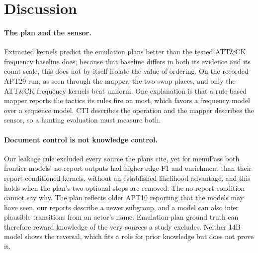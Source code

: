 \documentclass[letterpaper]{article} %
\newif\ifflags
\newcommand{\flag}[1]{\ifflags\textcolor{red}{\textsuperscript{\textbf{[#1]}}}\fi}
\begin{document}
\section{Discussion}

\paragraph{The plan and the sensor.} Extracted kernels predict the emulation plans better than the tested ATT\&CK frequency baseline does; because that baseline differs in both its evidence and its count scale, this does not by itself isolate the value of ordering. On the recorded APT29 run, as seen through the mapper, the two swap places, and only the ATT\&CK frequency kernels beat uniform. One explanation is that a rule-based mapper reports the tactics its rules fire on most, which favors a frequency model over a sequence model. CTI describes the operation and the mapper describes the sensor, so a hunting evaluation must measure both.

\paragraph{Document control is not knowledge control.} Our leakage rule excluded every source the plans cite, yet for menuPass both frontier models' no-report outputs had higher edge-F1 and enrichment than their report-conditioned kernels, without an established likelihood advantage, and this holds when the plan's two optional steps are removed. The no-report condition cannot say why. The plan reflects older APT10 reporting that the models may have seen,\flag{F7} our reports describe a newer subgroup, and a model can also infer plausible transitions from an actor's name. Emulation-plan ground truth can therefore reward knowledge of the very sources a study excludes. Neither 14B model shows the reversal, which fits a role for prior knowledge but does not prove it.
\end{document}
